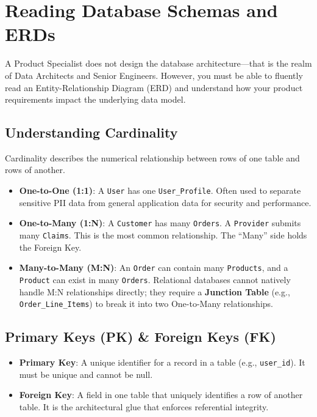 \bigskip

\section{Reading Database Schemas and
ERDs}\label{reading-database-schemas-and-erds}

A Product Specialist does not design the database architecture---that is
the realm of Data Architects and Senior Engineers. However, you must be
able to fluently read an Entity-Relationship Diagram (ERD) and
understand how your product requirements impact the underlying data
model.

\subsection{Understanding Cardinality}\label{understanding-cardinality}

Cardinality describes the numerical relationship between rows of one
table and rows of another.

\begin{itemize}
\tightlist
\item
  \textbf{One-to-One (1:1)}: A \texttt{User} has one
  \texttt{User\_Profile}. Often used to separate sensitive PII data from
  general application data for security and performance.
\item
  \textbf{One-to-Many (1:N)}: A \texttt{Customer} has many
  \texttt{Orders}. A \texttt{Provider} submits many \texttt{Claims}.
  This is the most common relationship. The ``Many'' side holds the
  Foreign Key.
\item
  \textbf{Many-to-Many (M:N)}: An \texttt{Order} can contain many
  \texttt{Products}, and a \texttt{Product} can exist in many
  \texttt{Orders}. Relational databases cannot natively handle M:N
  relationships directly; they require a \textbf{Junction Table} (e.g.,
  \texttt{Order\_Line\_Items}) to break it into two One-to-Many
  relationships.
\end{itemize}

\subsection{Primary Keys (PK) \& Foreign Keys
(FK)}\label{primary-keys-pk-foreign-keys-fk}

\begin{itemize}
\tightlist
\item
  \textbf{Primary Key}: A unique identifier for a record in a table
  (e.g., \texttt{user\_id}). It must be unique and cannot be null.
\item
  \textbf{Foreign Key}: A field in one table that uniquely identifies a
  row of another table. It is the architectural glue that enforces
  referential integrity.
\end{itemize}

